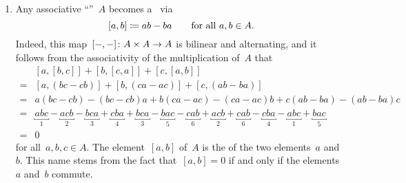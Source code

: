 \begin{examples}
	\label{examples for lie algebras}
	\leavevmode
	\begin{enumerate}
		\item
			Any associative \enquote{\algebra{$\kf$}}~$A$ becomes a~{\liealgebra{$\kf$}} via
			\[
				[a,b]
				\coloneqq
				ab - ba
				\qquad
				\text{for all~$a, b \in A$.}
			\]
			Indeed, this map~$[\ph, \ph] \colon A \times A \to A$ is bilinear and alternating, and it follows from the associativity of the multiplication of~$A$ that
			\begin{align*}
				 {}&  [a,[b,c]] + [b,[c,a]] + [c,[a,b]] \\
				={}&  [a, (bc-cb)] + [b, (ca-ac)] + [c, (ab-ba)] \\
				={}&  a(bc-cb)-(bc-cb)a + b(ca-ac) - (ca-ac)b + c(ab-ba) - (ab-ba)c \\
				={}&  \underbracket{abc}_{1}
							- \underbracket{acb}_{2}
							- \underbracket{bca}_{3}
							+ \underbracket{cba}_{4}
							+ \underbracket{bca}_{3}
							- \underbracket{bac}_{5}
							- \underbracket{cab}_{6}
							+ \underbracket{acb}_{2}
							+ \underbracket{cab}_{6}
							- \underbracket{cba}_{4}
							- \underbracket{abc}_{1}
							+ \underbracket{bac}_{5} \\
				={}&  0
			\end{align*}
			for all~$a, b, c \in A$.
			The element~$[a,b]$ of~$A$ is the  of the two elements~$a$ and~$b$.
			This name stems from the fact that~$[a,b] = 0$ if and only if the elements~$a$ and~$b$ commute.


\end{enumerate}
\end{examples}
